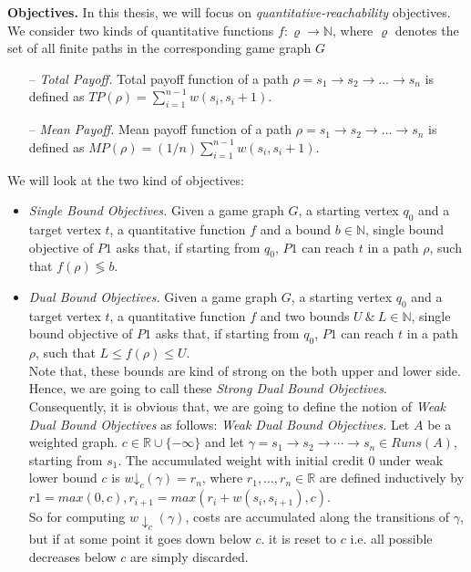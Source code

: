 \textbf{Objectives.} In this thesis, we will focus on \textit{quantitative-reachability} objectives. We consider two kinds of quantitative functions $f: \varrho \rightarrow \mathbb{N}$, where $\varrho$ denotes the set of all finite paths in the corresponding game graph $G$\\
\begin{itemize}
\item[--] \textit{Total Payoff.} Total payoff function of a path $\rho= s_1 \rightarrow s_2 \rightarrow \ldots \rightarrow s_n$ is defined as $TP(\rho)= \sum_{i=1}^{n-1} w(s_i,s_i+1)$.\\
\item[--] \textit{Mean Payoff.} Mean payoff function of a path $\rho= s_1 \rightarrow s_2 \rightarrow \ldots \rightarrow s_n$ is defined as $MP(\rho)= (1/n)\sum_{i=1}^{n-1} w(s_i,s_i+1)$.\\

\end{itemize}
 We will look at the two kind of objectives:\\
 \begin{itemize}
 \item \textit{Single Bound Objectives.} Given a game graph $G$, a starting vertex $q_0$ and a target vertex $t$, a quantitative function $f$ and a bound $b \in \mathbb{N}$, single bound objective of $P1$ asks that, if starting from $q_0$, $P1$ can reach $t$ in a path $\rho$, such that $f(\rho) \lessgtr b$.
 
 \item \textit{Dual Bound Objectives.} Given a game graph $G$, a starting vertex $q_0$ and a target vertex $t$, a quantitative function $f$ and two bounds $U\  \& \ L \in \mathbb{N}$, single bound objective of $P1$ asks that, if starting from $q_0$, $P1$ can reach $t$ in a path $\rho$, such that $L \leq f(\rho) \leq U$. \\
\vskip 1cm
Note that, these bounds are kind of strong on the both upper and lower side. Hence, we are going to call these \textit{Strong Dual Bound Objectives}. Consequently, it is obvious that, we are going to define the notion of \textit{Weak Dual Bound Objectives} as follows:
\vskip 0.5cm
\textit{Weak Dual Bound Objectives.} Let $A$ be a weighted graph. $c \in \mathbb{R} \cup \{- \infty\}$
and let $\gamma =s_1 \rightarrow s_2 \rightarrow \cdots \rightarrow s_n \in Runs(A)$, starting from $s_1$. The accumulated weight with
initial credit 0 under weak lower bound $c$ is $w\mathord{\downarrow}_{c}(\gamma) = r_n$, where $r_1, \ldots, r_n \in \mathbb{R}$
are defined inductively by $r1 = max(0,c), r_{i+1} = max(r_i + w(s_i, s_{i+1}), c)$.\\
So for computing $w\downarrow_{c}(\gamma)$, costs are accumulated along the transitions of $\gamma$,
but if at some point it goes down below $c$. it is reset to $c$  i.e. all possible decreases below $c$ are
simply discarded. \\
 \end{itemize}
